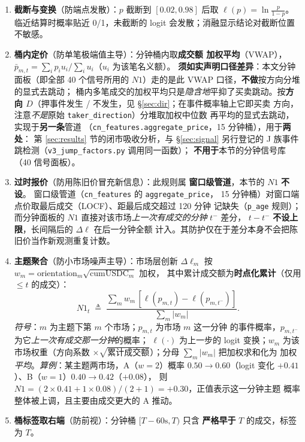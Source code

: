 \documentclass[11pt, a4paper]{ctexart}
\newcommand{\code}[1]{\texttt{\small #1}}
\newcommand{\eqdef}{\;\triangleq\;}
\begin{document}
\begin{enumerate}
\item \textbf{截断与变换}（防端点发散）：$p$ 截断到 $[0.02, 0.98]$
  后取 $\ell(p)=\ln\frac{p}{1-p}$。临近结算时概率贴近 0/1，未截断的
  logit 会发散；消融显示结论对截断位置不敏感。
\item \textbf{桶内定价}（防单笔极端值主导）：分钟桶内取\textbf{成交额
  加权平均}（VWAP），
  $\bar p_{m,t}=\sum_i p_i u_i / \sum_i u_i$（$u_i$ 为该笔名义额）。
  \textbf{须如实声明口径差异}：本文分钟面板（即全部 40 个信号所用的
  $N1$）走的是此 VWAP 口径，\textbf{不做}按方向分堆的显式去跳动；
  桶内多笔成交的加权平均只是\emph{隐含地}平抑了买卖跳动。按\textbf{方向
  $D$}（押事件发生 / 不发生，见 §\ref{sec:dir}；在事件概率轴上它即买卖
  方向，注意\emph{不是}原始 \code{taker\_direction}）分堆取加权中位数
  再平均的显式去跳动，实现于\textbf{另一条}管道
  （\code{cn\_features.aggregate\_price}，15 分钟桶），用于\textbf{两处}：
  第 \ref{sec:results} 节的闭市吸收分析，与 §\ref{sec:signal} 另行登记的
  J 族事件跳检测（\code{v3\_jump\_factors.py} 调用同一函数）；
  \textbf{不用于}本节的分钟信号库（40 信号面板）。
\item \textbf{过时报价}（防用陈旧价冒充新信息）：此规则属
  \textbf{窗口级管道}，本节的 $N1$ \textbf{不设}。
  窗口级管道（\code{cn\_features} 的 \code{aggregate\_price}，
  15 分钟桶）对窗口端点价取最后成交（LOCF）、距最后成交超过 120 分钟
  记缺失（\code{p\_age} 规则）；
  而分钟面板的 $N1$ 直接对该市场\emph{上一次有成交的分钟} $t^-$ 差分，
  $t-t^-$ \textbf{不设上限}，长间隔后的 $\Delta\ell$ 在后一分钟全额
  计入。其防护仅在于差分本身不会把陈旧价当作新观测重复计数。
\item \textbf{主题聚合}（防小市场噪声主导）：市场层创新 $\Delta\ell_m$
  按 $w_m=\mathrm{orientation}_m\sqrt{\mathrm{cumUSDC}_m}$ 加权，
  其中累计成交额为\textbf{时点化累计}（仅用 $\le t$ 的成交）：
  \[
  N1_t \eqdef \frac{\sum_m w_m\,[\ell(p_{m,t})-\ell(p_{m,t^-})]}
  {\sum_m |w_m|}.
  \]
  \emph{符号}：$m$ 为主题下第 $m$ 个市场；$p_{m,t}$ 为市场 $m$ 这一分钟
  的事件概率，$p_{m,t^-}$ 为它\emph{上一次有成交那一分钟}的概率；
  $\ell(\cdot)$ 为上一步的 logit 变换；$w_m$ 为该市场权重（方向系数
  $\times\sqrt{\text{累计成交额}}$）；分母 $\sum_m|w_m|$ 把加权求和化为
  加权\emph{平均}。\emph{算例}：某主题两市场，A（$w=2$）概率
  $0.50\to0.60$（logit 变化 $+0.41$）、B（$w=1$）$0.40\to0.42$（$+0.08$），
  则 $N1=(2\times0.41+1\times0.08)/(2+1)=+0.30$，正值表示这一分钟主题
  概率整体被上调，且主要由成交更大的 A 推动。
\item \textbf{桶标签取右端}（防前视）：分钟桶 $[T-60\text{s}, T)$ 只含
  \textbf{严格早于} $T$ 的成交，标签为 $T$。
\end{enumerate}
\end{document}

